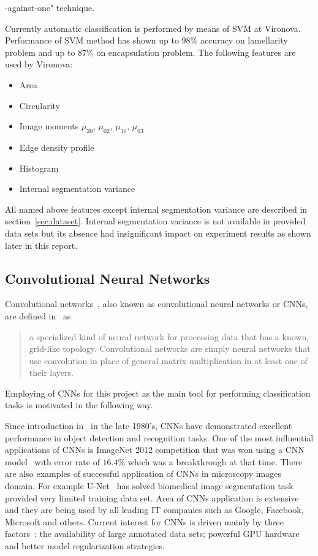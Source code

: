 \documentclass[a4paper, 11pt, table]{article}
\begin{document}
-against-one" technique.

Currently automatic classification is performed by means of SVM at Vironova. Performance of SVM method has shown up to $98\%$ accuracy on lamellarity problem and up to $87\%$ on encapsulation problem. The following features are used by Vironova:
\begin{itemize}
\item Area
\item Circularity
\item Image moments $\mu_{20}$, $\mu_{02}$, $\mu_{30}$, $\mu_{03}$
\item Edge density profile
\item Histogram
\item Internal segmentation variance
\end{itemize}

All named above features except internal segmentation variance are described in section~\ref{sec:dataset}. Internal segmentation variance is not available in provided data sets but its absence had insignificant impact on experiment results as shown later in this report.  

\subsection{Convolutional Neural Networks}
Convolutional networks~\cite{LeCun1986}, also known as convolutional neural networks or CNNs, are defined in~\cite{dl_book} as \blockquote{a specialized kind of neural network for processing data that has a known, grid-like topology. Convolutional networks are simply neural networks that use convolution in place of general matrix multiplication in at least one of their layers.}

Employing of CNNs for this project as the main tool for performing classification tasks is motivated in the following way. 

Since introduction in~\cite{LeCun1986} in the late 1980's, CNNs have demonstrated excellent performance in object detection and recognition tasks. One of the most influential applications of CNNs is ImageNet 2012 competition that was won using a CNN model~\cite{NIPS2012_4824} with error rate of $16.4\%$ which was a breakthrough at that time. There are also examples of successful application of CNNs in microscopy images domain. For example U-Net~\cite{Ronneberger2015} has solved biomedical image segmentation task provided very limited training data set. Area of CNNs application is extensive and they are being used by all leading IT companies such as Google, Facebook, Microsoft and others. Current interest for CNNs is driven mainly by three factors~\cite{Zeiler2014}: the availability of large annotated data sets; powerful GPU hardware and better model regularization strategies. 
\end{document}
